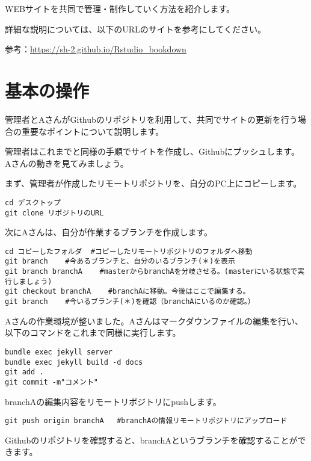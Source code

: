 \documentclass[
]{book}
\begin{document}
WEBサイトを共同で管理・制作していく方法を紹介します。

詳細な説明については、以下のURLのサイトを参考にしてください。

参考：\url{https://sh-2.github.io/Rstudio_bookdown}

\hypertarget{ux57faux672cux306eux64cdux4f5c}{%
\section{基本の操作}\label{ux57faux672cux306eux64cdux4f5c}}

管理者とAさんがGithubのリポジトリを利用して、共同でサイトの更新を行う場合の重要なポイントについて説明します。

管理者はこれまでと同様の手順でサイトを作成し、Githubにプッシュします。
Aさんの動きを見てみましょう。

まず、管理者が作成したリモートリポジトリを、自分のPC上にコピーします。

\begin{verbatim}
cd デスクトップ
git clone リポジトリのURL
\end{verbatim}

次にAさんは、自分が作業するブランチを作成します。

\begin{verbatim}
cd コピーしたフォルダ  #コピーしたリモートリポジトリのフォルダへ移動
git branch    #今あるブランチと、自分のいるブランチ(＊)を表示
git branch branchA    #masterからbranchAを分岐させる。(masterにいる状態で実行しましょう)
git checkout branchA    #branchAに移動。今後はここで編集する。
git branch    #今いるブランチ(＊)を確認（branchAにいるのか確認。）
\end{verbatim}

Aさんの作業環境が整いました。Aさんはマークダウンファイルの編集を行い、以下のコマンドをこれまで同様に実行します。

\begin{verbatim}
bundle exec jekyll server
bundle exec jekyll build -d docs
git add .
git commit -m"コメント"
\end{verbatim}

branchAの編集内容をリモートリポジトリにpushします。

\begin{verbatim}
git push origin branchA   #branchAの情報リモートリポジトリにアップロード
\end{verbatim}

Githubのリポジトリを確認すると、branchAというブランチを確認することができます。
\end{document}
